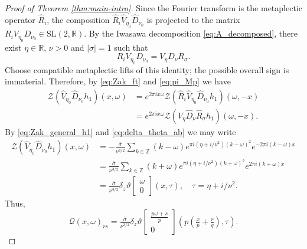 \documentclass[reqno,a4paper,12pt]{amsart}
\numberwithin{equation}{section}
\newcommand{\Z}{\mathbb Z}
\newcommand{\R}{\mathbb R}
\newcommand{\QQ}{\mathcal{Q}}
\newcommand{\thetac}[2]{{\vartheta\left[\begin{smallmatrix}
        #1 \\ #2
    \end{smallmatrix}\right]}}
\newcommand{\zak}{\mathcal{Z}}
\begin{document}
\begin{proof}[Proof of Theorem \ref{thm:main-intro}]
     Since the Fourier transform is the metaplectic operator $\widehat{R}_i$, the composition
     $\widehat{R}_i \widehat{V}_{\eta_0} \widehat{D}_{\nu_0}$ is projected to the matrix $R_i V_{\eta_0} D_{\nu_0}\in \mathrm{SL}(2,\R)$. By the Iwasawa decomposition \eqref{eq:A_decomposed}, there exist $\eta\in\R$, $\nu>0$ and $|\sigma|=1$ such that
     \begin{equation}
         R_i V_{\eta_0} D_{\nu_0} = V_{\eta} D_{\nu} R_\sigma.
     \end{equation}
     Choose compatible metaplectic lifts of this identity; the possible overall sign
     is immaterial. Therefore, by \eqref{eq:Zak_ft} and \eqref{eq:pi_Mp} we have
     \begin{equation}
         \begin{split}
             \zak (\widehat{V}_{\eta_0} \widehat{D}_{\nu_0}h_1) (x,\omega) &= 
         e^{2\pi i x\omega} \zak (\widehat{R}_i \widehat{V}_{\eta_0} \widehat{D}_{\nu_0} h_1)(\omega, -x)  \\
         &= e^{2\pi i x\omega} \zak (\widehat{V}_{\eta} \widehat{D}_{\nu}\widehat{R}_\sigma h_1)(\omega, -x).
         \end{split}
     \end{equation}
     By \eqref{eq:Zak_general_h1} and \eqref{eq:delta_theta_ab} we may write
     \begin{equation}
         \begin{split}
                          \zak (\widehat{V}_{\eta_0} \widehat{D}_{\nu_0}h_1) (x,\omega)
        &= -\tfrac{\overline{\sigma}}{\nu^{3/2}}
        \sum_{k\in\Z}(k-\omega) e^{\pi i (\eta+i/\nu^2)(k-\omega)^2} e^{-2\pi i (k-\omega) x} \\
             &= \tfrac{\overline{\sigma}}{\nu^{3/2}}
        \sum_{k\in\Z}(k+\omega) e^{\pi i (\eta+i/\nu^2)(k+\omega)^2} e^{2\pi i (k+\omega) x} \\
        & = \tfrac{\overline{\sigma}}{\nu^{3/2}} \delta_z\thetac{\omega}{0}(x,\tau),\quad \tau = \eta+i/\nu^2
        .
         \end{split}
     \end{equation}
Thus,
\begin{equation}
        \QQ(x,\omega)_{rs}
    = 
    \tfrac{\overline{\sigma}}{\nu^{3/2}} \delta_z\thetac{\tfrac{p\omega+s}{p}}{0}(p(\tfrac{x}{p}+\tfrac{r}{q}),\tau).
\end{equation}


\end{proof}
\end{document}
